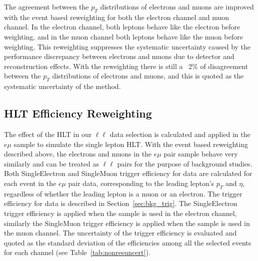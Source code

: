 \vspace{0.3cm}
The agreement between the $p_T$ distributions of electrons and muons are improved with the event based reweighting for both the electron channel and muon channel. In the electron channel, both leptons behave like the electron before weighting, and in the muon channel both leptons behave like the muon before weighting. This reweighting suppresses the systematic uncertainty caused by the performance discrepancy between electrons and muons due to detector and reconstruction effects. With the reweighting there is still a ~2\% of disagreement between the $p_T$ distributions of electrons and muons, and this is quoted as the systematic uncertainty of the method.

\subsection{HLT Efficiency Reweighting}
The effect of the HLT in our $\ell \ell$ data selection is calculated and applied in the $e\mu$ sample to simulate the single lepton HLT. With the event based reweighting described above, the electrons and muons in the $e\mu$ pair sample behave very similarly and can be treated as $\ell \ell$ pairs for the purpose of background studies. Both SingleElectron and SingleMuon trigger efficiency for data are calculated for each event in the $e\mu$ pair data, corresponding to the leading lepton's $p_T$ and $\eta$, regardless of whether the leading lepton is a muon or an electron. The trigger efficiency for data is described in Section~\ref{sec:bkg_trig}. The SingleElectron trigger efficiency is applied when the sample is used in the electron channel, similarly the SingleMuon trigger efficiency is applied when the sample is used in the muon channel. The uncertainty of the trigger efficiency is evaluated and quoted as the standard deviation of the efficiencies among all the selected events for each channel (see Table~\ref{tab:nonresuncert}).

